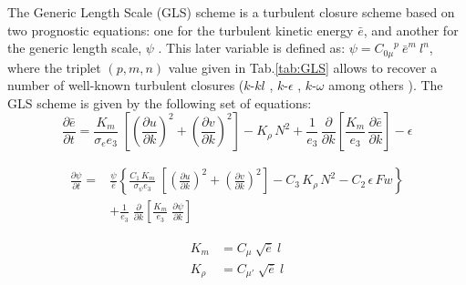 \documentclass[../tex_main/NEMO_manual]{subfiles}
\begin{document}

The Generic Length Scale (GLS) scheme is a turbulent closure scheme based on two prognostic equations:
one for the turbulent kinetic energy $\bar {e}$, and another for the generic length scale,
$\psi$ \citep{Umlauf_Burchard_JMS03, Umlauf_Burchard_CSR05}.
This later variable is defined as: $\psi = {C_{0\mu}}^{p} \ {\bar{e}}^{m} \ l^{n}$, 
where the triplet $(p, m, n)$ value given in Tab.\autoref{tab:GLS} allows to recover a number of
well-known turbulent closures ($k$-$kl$ \citep{Mellor_Yamada_1982}, $k$-$\epsilon$ \citep{Rodi_1987},
$k$-$\omega$ \citep{Wilcox_1988} among others \citep{Umlauf_Burchard_JMS03,Kantha_Carniel_CSR05}). 
The GLS scheme is given by the following set of equations:
\begin{equation} \label{eq:zdfgls_e}
\frac{\partial \bar{e}}{\partial t} = 
\frac{K_m}{\sigma_e e_3 }\;\left[ {\left( \frac{\partial u}{\partial k} \right)^2
                                                   +\left( \frac{\partial v}{\partial k} \right)^2} \right]
-K_\rho \,N^2
+\frac{1}{e_3}\,\frac{\partial}{\partial k} \left[ \frac{K_m}{e_3}\,\frac{\partial \bar{e}}{\partial k} \right]
- \epsilon
\end{equation}

\begin{equation} \label{eq:zdfgls_psi}
   \begin{split}
\frac{\partial \psi}{\partial t} =& \frac{\psi}{\bar{e}} \left\{
\frac{C_1\,K_m}{\sigma_{\psi} {e_3}}\;\left[ {\left( \frac{\partial u}{\partial k} \right)^2
                                                                   +\left( \frac{\partial v}{\partial k} \right)^2} \right]
- C_3 \,K_\rho\,N^2   - C_2 \,\epsilon \,Fw   \right\}             \\
&+\frac{1}{e_3}  \;\frac{\partial }{\partial k}\left[ {\frac{K_m}{e_3 }
                                  \;\frac{\partial \psi}{\partial k}} \right]\;
   \end{split}
\end{equation}

\begin{equation} \label{eq:zdfgls_kz}
   \begin{split}
         K_m    &= C_{\mu} \ \sqrt {\bar{e}} \ l         \\
         K_\rho &= C_{\mu'}\ \sqrt {\bar{e}} \ l
   \end{split}
\end{equation}
\end{document}
